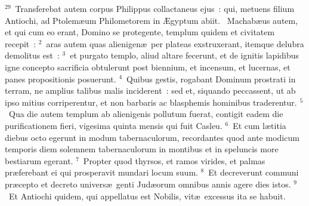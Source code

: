 ${}^{29}$~Transferebat autem corpus Philippus collactaneus ejus~: qui, metuens filium Antiochi, ad Ptolem\ae um Philometorem in \AE gyptum abiit.
~Machab\ae us autem, et qui cum eo erant, Domino se protegente, templum quidem et civitatem recepit~:
${}^{2}$~aras autem quas alienigen\ae\ per plateas exstruxerant, itemque delubra demolitus est~:
${}^{3}$~et purgato templo, aliud altare fecerunt, et de ignitis lapidibus igne concepto sacrificia obtulerunt post biennium, et incensum, et lucernas, et panes propositionis posuerunt.
${}^{4}$~Quibus gestis, rogabant Dominum prostrati in terram, ne amplius talibus malis inciderent~: sed et, siquando peccassent, ut ab ipso mitius corriperentur, et non barbaris ac blasphemis hominibus traderentur.
${}^{5}$~Qua die autem templum ab alienigenis pollutum fuerat, contigit eadem die purificationem fieri, vigesima quinta mensis qui fuit Casleu.
${}^{6}$~Et cum l\ae titia diebus octo egerunt in modum tabernaculorum, recordantes quod ante modicum temporis diem solemnem tabernaculorum in montibus et in speluncis more bestiarum egerant.
${}^{7}$~Propter quod thyrsos, et ramos virides, et palmas pr\ae ferebant ei qui prosperavit mundari locum suum.
${}^{8}$~Et decreverunt communi pr\ae cepto et decreto univers\ae\ genti Jud\ae orum omnibus annis agere dies istos.
${}^{9}$~Et Antiochi quidem, qui appellatus est Nobilis, vit\ae\ excessus ita se habuit.


